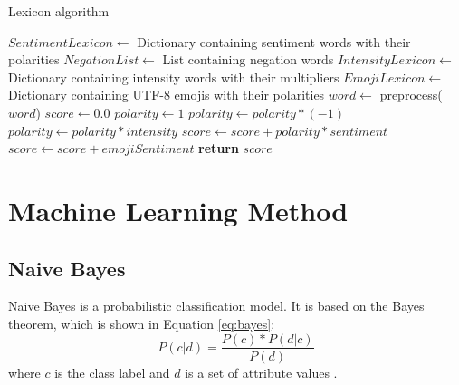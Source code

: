 \begin{algorithm}[H]
  \caption{Lexicon algorithm}\label{euclid}
    \begin{algorithmic}[1]
            \State $SentimentLexicon \gets$ Dictionary containing sentiment words with their polarities
            \State $NegationList \gets$ List containing negation words
            \State $IntensityLexicon \gets$ Dictionary containing intensity words with their multipliers
            \State $EmojiLexicon \gets$ Dictionary containing UTF-8 emojis with their polarities
                \State $word \gets$ preprocess($word$)
                \State $score \gets 0.0$
                    \State $polarity \gets 1$
                            \State $polarity \gets polarity * (-1)$
                        \Else
                                \State $polarity \gets polarity * intensity$
                            \EndIf
                        \EndIf
                    \EndFor
                    \State $score \gets score + polarity * sentiment$
                \Else
                        \State $score \gets score + emojiSentiment$
                    \EndIf
                \EndIf 
            \EndFor
            \State \textbf{return} $score$
        \EndProcedure
    \end{algorithmic}
\end{algorithm}




\section{Machine Learning Method}
    \subsection{Naive Bayes}
        Naive Bayes is a probabilistic classification model. It is based on the Bayes theorem, which is shown in Equation \eqref{eq:bayes}:
        \begin{equation}
            \label{eq:bayes}
            P(c|d) = \frac{P(c) * P(d|c)}{P(d)}
        \end{equation}
        where $c$ is the class label and $d$ is a set of attribute values \cite{DBLP:books/aw/TanSKK2019}. 
        
